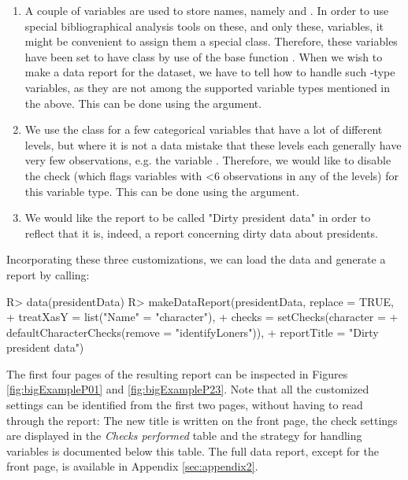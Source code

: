 \documentclass[article,shortnames]{jss}
\begin{document}
\begin{enumerate}
\item A couple of variables are used to store names, namely  and . In order to use special bibliographical analysis tools on these, and only these, variables, it might be convenient to assign them a special class. Therefore, these variables have been set to have class  by use of the base  function . When we wish to make a data report for the dataset, we have to tell  how to handle such -type variables, as they are not among the supported variable types mentioned in the above. This can be done using the  argument.
\item We use the  class for a few categorical variables that have a lot of different levels, but where it is not a data mistake that these levels each generally have very few observations, e.g. the variable . Therefore, we would like to disable the  check (which flags variables with <6 observations in any of the levels) for this variable type. This can be done using the  argument.
\item We would like the report to be called "Dirty president data" in order to reflect that it is, indeed, a report concerning dirty data about presidents.
\end{enumerate}
Incorporating these three customizations, we can load the data and generate a report by calling:

\begin{Schunk}
\begin{Sinput}
R> data(presidentData)
R> makeDataReport(presidentData, replace = TRUE, 
+    treatXasY = list("Name" = "character"),
+    checks = setChecks(character = 
+    defaultCharacterChecks(remove = "identifyLoners")),
+    reportTitle = "Dirty president data")
\end{Sinput}
\end{Schunk}

The first four pages of the resulting report can be inspected in Figures \ref{fig:bigExampleP01} and \ref{fig:bigExampleP23}. Note that all the customized settings can be identified from the first two pages, without having to read through the report: The new title is written on the front page, the check settings are displayed in the \textit{Checks performed} table and the strategy for handling  variables is documented below this table. The full data report, except for the front page, is available in Appendix \ref{sec:appendix2}. 
\end{document}
